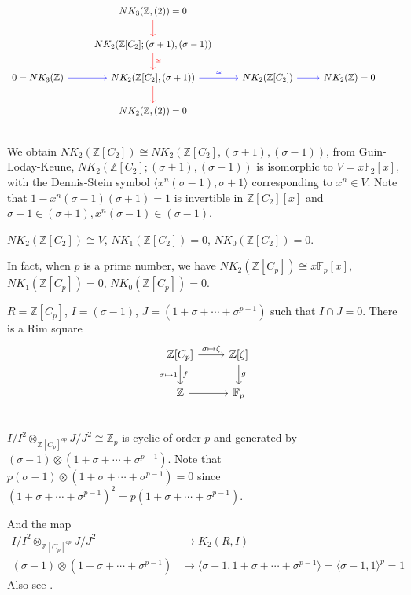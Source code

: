{\[\begin{tikzcd}
	 & NK_3(\mathbb{Z}, (2))=0 \ar[d, red] & & & \\
	 & NK_2(\mathbb{Z}[C_2];(\sigma+1), (\sigma-1)) \ar[d, red, "\cong", red] \\
0=NK_3(\mathbb{Z})	\ar[r, blue] & NK_2(\mathbb{Z}[C_2], (\sigma+1)) \ar[r, blue, "\cong", blue] \ar[d, red] & NK_2(\mathbb{Z}[C_2]) \ar[r, blue] &NK_2(\mathbb{Z})=0\\
	& NK_2(\mathbb{Z}, (2))=0 \\
\end{tikzcd}
\]
We obtain $NK_2(\mathbb{Z}[C_2])\cong NK_2(\mathbb{Z}[C_2], (\sigma+1), (\sigma-1))$, from Guin-Loday-Keune\cite{Guin-Waléry1981}, $NK_2(\mathbb{Z}[C_2];(\sigma+1), (\sigma-1))$ is isomorphic to $V=x \mathbb{F}_2[x]$, with the Dennis-Stein symbol $\langle x^n(\sigma-1), \sigma+1 \rangle$ corresponding to $x^n\in V$. Note that $1-x^n(\sigma-1)(\sigma+1)=1$ is invertible in $\mathbb{Z}[C_2][x]$ and $\sigma+1 \in (\sigma+1), x^n(\sigma-1) \in (\sigma-1)$. 

\begin{theorem}
	$NK_2(\mathbb{Z}[C_2])\cong V$, $NK_1(\mathbb{Z}[C_2])=0$, $NK_0(\mathbb{Z}[C_2])=0$. 
\end{theorem}

In fact, when $p$ is a prime number, we have $NK_2(\mathbb{Z}[C_p])\cong x \mathbb{F}_p[x]$, $NK_1(\mathbb{Z}[C_p])=0$, $NK_0(\mathbb{Z}[C_p])=0$. 

\begin{example}[{$\mathbb{Z}[C_p]$}]
	$R=\mathbb{Z}[C_p]$, $I=(\sigma-1)$, $J=(1+\sigma+\cdots+\sigma^{p-1})$ such that $I\cap J =0$. There is a Rim square
		\[\begin{tikzcd}
			\mathbb{Z}[C_p] \ar[r, "\sigma \mapsto \zeta"] \ar[d, "f", "\sigma\mapsto 1"']& \mathbb{Z}[\zeta]\ar[d, "g"]\\
			\mathbb{Z} \ar[r] & \mathbb{F}_p\\
		\end{tikzcd}\]
$I/I^2\otimes_{\mathbb{Z}[C_p]^{op}}J/J^2 \cong \mathbb{Z}_p$ is cyclic of order $p$ and generated by $(\sigma-1)\otimes(1+\sigma+\cdots+\sigma^{p-1})$. Note that $p(\sigma-1)\otimes(1+\sigma+\cdots+\sigma^{p-1})=0$ since $(1+\sigma+\cdots+\sigma^{p-1})^2=p(1+\sigma+\cdots+\sigma^{p-1})$. 

And the map 
\begin{align*}
I/I^2\otimes_{\mathbb{Z}[C_p]^{op}}J/J^2 &\longrightarrow K_2(R, I)\\
(\sigma-1)\otimes(1+\sigma+\cdots+\sigma^{p-1}) & \mapsto \langle \sigma-1, 1+\sigma+\cdots+\sigma^{p-1} \rangle =\langle \sigma-1, 1\rangle^p=1
\end{align*}
Also see \cite{STEIN1980213}. 


\end{example}}
